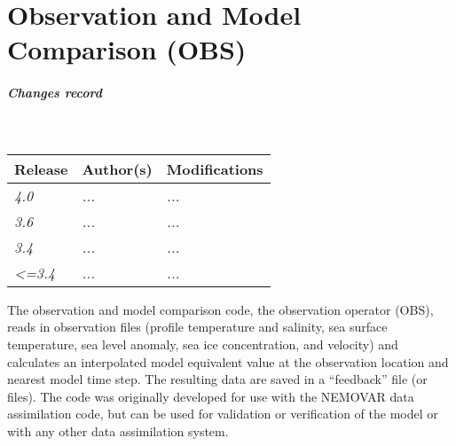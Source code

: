 \documentclass[../main/NEMO_manual]{subfiles}
\begin{document}
\chapter{Observation and Model Comparison (OBS)}
\label{chap:OBS}


\chaptertoc

\paragraph{Changes record} ~\\

{\footnotesize
  \begin{tabularx}{\textwidth}{l||X|X}
    Release & Author(s) & Modifications \\
    \hline
    {\em   4.0} & {\em ...} & {\em ...} \\
    {\em   3.6} & {\em ...} & {\em ...} \\
    {\em   3.4} & {\em ...} & {\em ...} \\
    {\em <=3.4} & {\em ...} & {\em ...}
  \end{tabularx}
}

\clearpage

The observation and model comparison code, the observation operator (OBS), reads in observation files
(profile temperature and salinity, sea surface temperature, sea level anomaly, sea ice concentration, and velocity) and calculates an interpolated model equivalent value at the observation location and nearest model time step.
The resulting data are saved in a ``feedback'' file (or files).
The code was originally developed for use with the NEMOVAR data assimilation code,
but can be used for validation or verification of the model or with any other data assimilation system.
\end{document}
